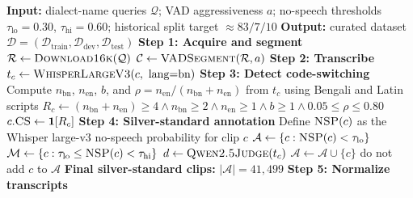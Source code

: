 \documentclass[journal]{IEEEtran}
\begin{document}
\begin{algorithm}[t]
\caption{AncholVox: From raw dialectal audio to a curated CS-ASR benchmark}
\label{alg:pipeline}
\footnotesize
\begin{algorithmic}[1]
\Statex \textbf{Input:} dialect-name queries $\mathcal{Q}$; VAD aggressiveness $a$; no-speech thresholds $\tau_{\text{lo}}{=}0.30$, $\tau_{\text{hi}}{=}0.60$; historical split target $\approx83/7/10$
\Statex \textbf{Output:} curated dataset $\mathcal{D}=(\mathcal{D}_{\text{train}},\mathcal{D}_{\text{dev}},\mathcal{D}_{\text{test}})$
\vspace{0.2em}
\Statex \textbf{Step 1: Acquire and segment}
\State $\mathcal{R} \gets \textsc{Download16k}(\mathcal{Q})$ 
\State $\mathcal{C} \gets \textsc{VADSegment}(\mathcal{R}, a)$ 
\vspace{0.2em}
\Statex \textbf{Step 2: Transcribe}
    \State $t_c \gets \textsc{WhisperLargeV3}(c,\ \text{lang}{=}\text{bn})$
\EndFor
\vspace{0.2em}
\Statex \textbf{Step 3: Detect code-switching}
    \State Compute $n_{\mathrm{bn}}$, $n_{\mathrm{en}}$, $b$, and $\rho = n_{\mathrm{en}}/(n_{\mathrm{bn}}+n_{\mathrm{en}})$ from $t_c$ using Bengali and Latin scripts
    \State $R_c \gets (n_{\mathrm{bn}}+n_{\mathrm{en}})\ge4 \land n_{\mathrm{bn}}\ge2 \land n_{\mathrm{en}}\ge1 \land b\ge1 \land 0.05\le\rho\le0.80$
    \State $c.\textsc{CS} \gets \mathbf{1}\!\left[R_c\right]$
\EndFor
\vspace{0.2em}
\Statex \textbf{Step 4: Silver-standard annotation}
\State Define $\textsc{NSP}(c)$ as the Whisper large-v3 no-speech probability for clip $c$
\State $\mathcal{A} \gets \{c : \textsc{NSP}(c) < \tau_{\text{lo}}\}$ 
\State $\mathcal{M} \gets \{c : \tau_{\text{lo}} \le \textsc{NSP}(c) < \tau_{\text{hi}}\}$ 
    \State $d \gets \textsc{Qwen2.5Judge}(t_c)$ 
        \State $\mathcal{A} \gets \mathcal{A} \cup \{c\}$ 
    \Else
        \State do not add $c$ to $\mathcal{A}$ 
    \EndIf
\EndFor
\State \textbf{Final silver-standard clips:} $|\mathcal{A}|=41{,}499$
\vspace{0.2em}
\Statex \textbf{Step 5: Normalize transcripts}

\end{algorithmic}
\end{algorithm}
\end{document}

